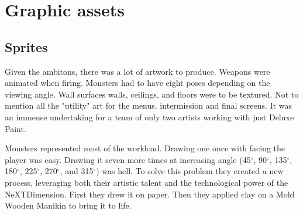 \section{Graphic assets}
\subsection{Sprites}
Given the ambitons, there was a lot of artwork to produce. Weapons were animated when firing. Monsters had to have eight poses depending on the viewing angle. Wall surfaces walls, ceilings, and floors were to be textured. Not to mention all the "utility" art for the menus. intermission and final screens. It was an immense undertaking for a team of only two artists working with just Deluxe Paint.\\
\par
Monsters represented most of the workload. Drawing one once with facing the player was easy. Drawing it seven more times at increasing angle (45$^{\circ}$, 90$^{\circ}$, 135$^{\circ}$, 180$^{\circ}$, 225$^{\circ}$, 270$^{\circ}$, and 315$^{\circ}$) was hell. To solve this problem they created a new process, leveraging both their artistic talent and the technological power of the NeXTDimension. First they drew it on paper. Then they applied clay on a Mold Wooden Manikin to bring it to life.\\
\par


\\
\par

